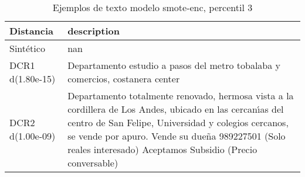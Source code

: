 \begin{table}[H]
\centering
\fontsize{10}{14}\selectfont
\caption{Ejemplos de texto modelo smote-enc, percentil 3}
\label{table-example-economicos-b-3-smote-enc-3p-text}
\begin{tabular}{|l|m{35em}|}
\hline
\rowcolor[gray]{0.8}
Distancia & description \\
\hline Sintético & nan \\
\hline DCR1 d(1.80e-15) & Departamento estudio a pasos del metro tobalaba y comercios, costanera center \\
\hline DCR2 d(1.00e-09) & Departamento totalmente renovado, hermosa vista a la cordillera de Los Andes, ubicado en las cercan{\'\i}as del centro de San Felipe, Universidad y colegios cercanos, se vende por apuro.
Vende su due\~na 989227501 (Solo reales interesado) 
Aceptamos Subsidio (Precio conversable) \\
\hline
\end{tabular}
\end{table}
